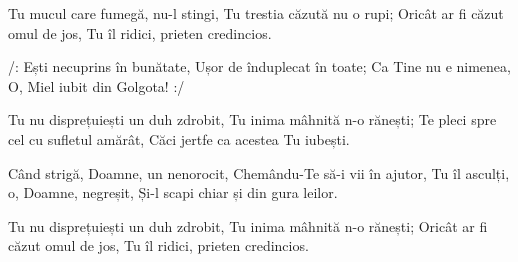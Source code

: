 \beginverse
Tu mucul care fumegă, nu-l stingi,
Tu trestia căzută nu o rupi;
Oricât ar fi căzut omul de jos,
Tu îl ridici, prieten credincios.
\endverse

\beginchorus
/: Ești necuprins în bunătate,
Ușor de înduplecat în toate;
Ca Tine nu e nimenea,
O, Miel iubit din Golgota! :/
\endchorus

\beginverse
Tu nu disprețuiești un duh zdrobit,
Tu inima mâhnită n-o rănești;
Te pleci spre cel cu sufletul amărât,
Căci jertfe ca acestea Tu iubești.
\endverse

\beginverse
Când strigă, Doamne, un nenorocit,
Chemându-Te să-i vii în ajutor,
Tu îl asculți, o, Doamne, negreșit,
Și-l scapi chiar și din gura leilor.
\endverse

\beginverse
Tu nu disprețuiești un duh zdrobit,
Tu inima mâhnită n-o rănești;
Oricât ar fi căzut omul de jos,
Tu îl ridici, prieten credincios.
\endverse
\endsong
